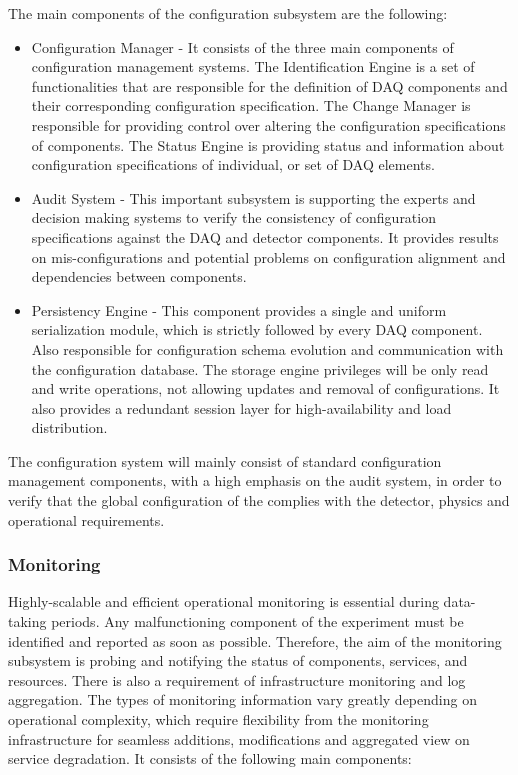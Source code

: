 The main components of the configuration subsystem are the following:
\begin{itemize}
\item Configuration Manager - It consists of the three main components of configuration management systems. The Identification Engine is a set of functionalities that are responsible for the definition of DAQ components and their corresponding configuration specification. The Change Manager is responsible for providing control over altering the configuration specifications of components. The Status Engine is providing status and information about configuration specifications of individual, or set of DAQ elements.
\item Audit System - This important subsystem is supporting the experts and decision making systems to verify the consistency of configuration specifications against the DAQ and detector components. It provides results on mis-configurations and potential problems on configuration alignment and dependencies between components.
\item Persistency Engine - This component provides a single and uniform serialization module, which is strictly followed by every DAQ component. Also responsible for configuration schema evolution and communication with the configuration database. The storage engine privileges will be only read and write operations, not allowing updates and removal of configurations. It also provides a redundant session layer for high-availability and load distribution.
\end{itemize}

The configuration system will mainly consist of standard configuration management components, with a high emphasis on the audit system, in order to verify that the global configuration of the  complies with the detector, physics and operational requirements.

\subsubsection{Monitoring}
\label{sec:daq:design:ccm:monitoring}

Highly-scalable and efficient operational monitoring is essential during data-taking periods. Any malfunctioning component of the experiment must be identified and reported as soon as possible. Therefore, the aim of the monitoring subsystem is probing and notifying the status of  components, services, and resources. There is also a requirement of  infrastructure monitoring and log aggregation. The types of monitoring information vary greatly depending on operational complexity, which require flexibility from the monitoring infrastructure for seamless additions, modifications and aggregated view on service degradation.
It consists of the following main components:

